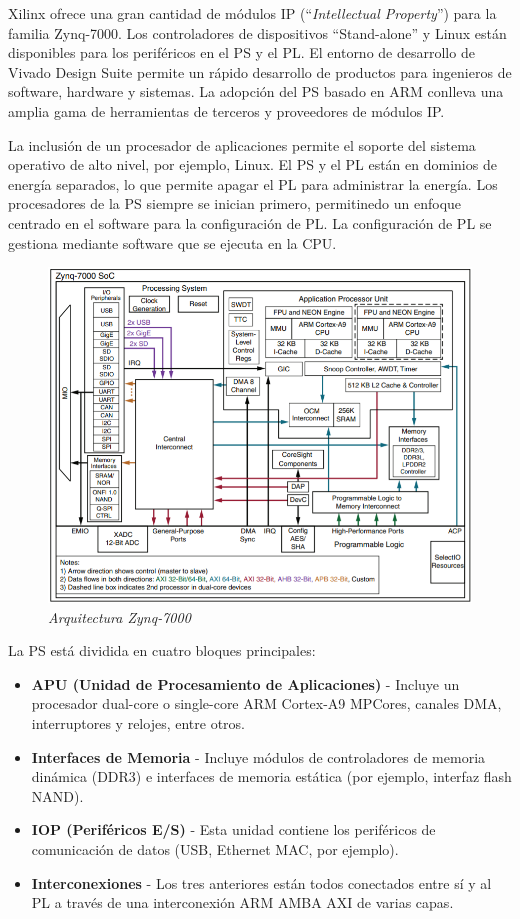 Xilinx ofrece una gran cantidad de módulos IP (``\textit{Intellectual Property}'') para la familia Zynq-7000. Los controladores de dispositivos ``Stand-alone'' y Linux están disponibles para los 
periféricos en el PS y el PL. El entorno de desarrollo de Vivado Design Suite permite un rápido desarrollo de productos para ingenieros de software, 
hardware y sistemas. La adopción del PS basado en ARM conlleva una amplia gama de herramientas de terceros y proveedores de módulos IP.

La inclusión de un procesador de aplicaciones permite el soporte del sistema operativo de alto nivel, por ejemplo, Linux. El PS y el PL están en dominios 
de energía separados, lo que permite apagar el PL para administrar la energía. Los procesadores de la PS siempre se inician primero, permitinedo un enfoque 
centrado en el software para la configuración de PL. La configuración de PL se gestiona mediante software que se ejecuta en la CPU.

\begin{figure}
    \centering
    \includegraphics[width = 1\textwidth]{imagenes/arqfamiliazynq.png}
    \caption{\textit{Arquitectura Zynq-7000 \cite{zynq7000}}}\label{zynq-7000}
\end{figure}

La PS está dividida en cuatro bloques principales:

\begin{itemize}
    \item \textbf{APU (Unidad de Procesamiento de Aplicaciones)} - Incluye un procesador dual-core o single-core ARM Cortex-A9 MPCores, canales DMA, interruptores y relojes, entre otros.
    \item \textbf{Interfaces de Memoria} - Incluye módulos de controladores de memoria dinámica (DDR3) e interfaces de memoria estática (por ejemplo, interfaz flash NAND).
    \item \textbf{IOP (Periféricos E/S)} - Esta unidad contiene los periféricos de comunicación de datos (USB, Ethernet MAC, por ejemplo).
    \item \textbf{Interconexiones} - Los tres anteriores están todos conectados entre sí y al PL a través de una interconexión ARM AMBA AXI de varias capas.
\end{itemize}

